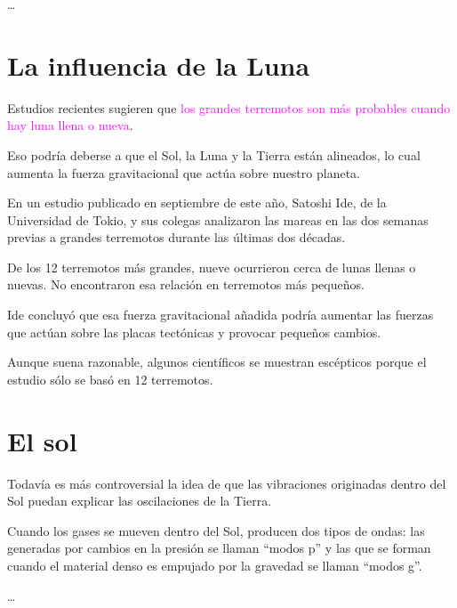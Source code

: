 \documentclass[12pt,a4paper]{article}
\begin{document}
\ldots

\section{La influencia de la Luna}

Estudios recientes sugieren que \textcolor{magenta}{\large los grandes terremotos son más probables cuando hay luna llena o nueva}.

Eso podría deberse a que el Sol, la Luna y la Tierra están alineados, lo cual aumenta la fuerza gravitacional que actúa sobre nuestro planeta.

En un estudio publicado en septiembre de este año, Satoshi Ide, de la Universidad de Tokio, y sus colegas analizaron las mareas en las dos semanas previas a grandes terremotos durante las últimas dos décadas.

De los 12 terremotos más grandes, nueve ocurrieron cerca de lunas llenas o nuevas. No encontraron esa relación en terremotos más pequeños.

Ide concluyó que esa fuerza gravitacional añadida podría aumentar las fuerzas que actúan sobre las placas tectónicas y provocar pequeños cambios.

Aunque suena razonable, algunos científicos se muestran escépticos porque el estudio sólo se basó en 12 terremotos.

\section{El sol}

Todavía es más controversial la idea de que las vibraciones originadas dentro del Sol puedan explicar las oscilaciones de la Tierra.

Cuando los gases se mueven dentro del Sol, producen dos tipos de ondas: las generadas por cambios en la presión se llaman ``modos p'' y las que se forman cuando el material denso es empujado por la gravedad se llaman ``modos g''.

\ldots
\end{document}
